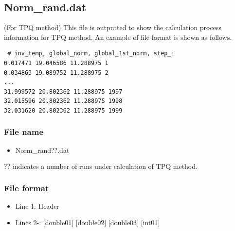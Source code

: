 \newpage
\subsection{Norm\_rand.dat}
\label{Subsec:normrand}
(For TPQ method) This file is outputted to show the calculation process information for TPQ method.
An example of file format is shown as follows.\\
\begin{minipage}{12.5cm}
\begin{screen}
\begin{verbatim}
 # inv_temp, global_norm, global_1st_norm, step_i 
0.017471 19.046586 11.288975 1
0.034863 19.089752 11.288975 2
...
31.999572 20.802362 11.288975 1997
32.015596 20.802362 11.288975 1998
32.031620 20.802362 11.288975 1999
\end{verbatim}
\end{screen}
\end{minipage}

\subsubsection{File name}
 \begin{itemize}
   \item Norm\_rand??.dat
  \end{itemize}
  ?? indicates a number of runs under calculation of TPQ method.

\subsubsection{File format}
 \begin{itemize}
   \item Line 1: Header
   \item Lines 2-: $[$double01$]$ $[$double02$]$ $[$double03$]$ $[$int01$]$
  \end{itemize}
